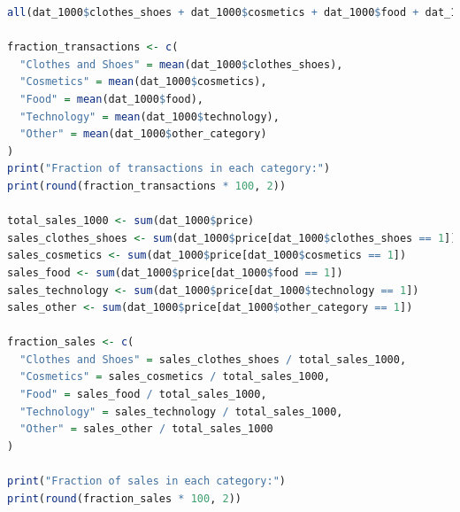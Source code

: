 \documentclass[a4paper,12pt]{article} %
\theoremstyle{nonitalic}
\newenvironment{solution}[1]
  {\renewcommand\theinnercustomsol{#1}\innercustomsol}
  {\endinnercustomsol}
\newcounter{solutionctr}[section]
\renewcommand{\thesolutionctr}{(\alph{solutionctr})}
\newenvironment{autosolution}
  {\stepcounter{solutionctr}\begin{solution}{\thesolutionctr}}
  {\end{solution}}
\begin{document}
\begin{autosolution}
\begin{lstlisting}[language=R]
all(dat_1000$clothes_shoes + dat_1000$cosmetics + dat_1000$food + dat_1000$technology + dat_1000$other_category == 1)

fraction_transactions <- c(
  "Clothes and Shoes" = mean(dat_1000$clothes_shoes),
  "Cosmetics" = mean(dat_1000$cosmetics),
  "Food" = mean(dat_1000$food),
  "Technology" = mean(dat_1000$technology),
  "Other" = mean(dat_1000$other_category)
)
print("Fraction of transactions in each category:")
print(round(fraction_transactions * 100, 2))

total_sales_1000 <- sum(dat_1000$price)
sales_clothes_shoes <- sum(dat_1000$price[dat_1000$clothes_shoes == 1])
sales_cosmetics <- sum(dat_1000$price[dat_1000$cosmetics == 1])
sales_food <- sum(dat_1000$price[dat_1000$food == 1])
sales_technology <- sum(dat_1000$price[dat_1000$technology == 1])
sales_other <- sum(dat_1000$price[dat_1000$other_category == 1])

fraction_sales <- c(
  "Clothes and Shoes" = sales_clothes_shoes / total_sales_1000,
  "Cosmetics" = sales_cosmetics / total_sales_1000,
  "Food" = sales_food / total_sales_1000,
  "Technology" = sales_technology / total_sales_1000,
  "Other" = sales_other / total_sales_1000
)

print("Fraction of sales in each category:")
print(round(fraction_sales * 100, 2))
    \end{lstlisting}
\end{autosolution}
\end{document}
